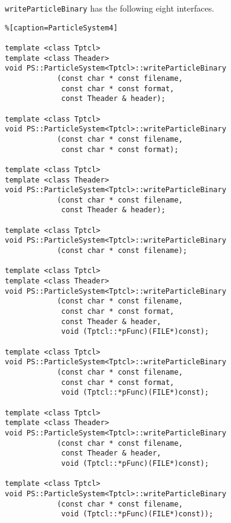 \label{sec:writeParticleBinary}

\texttt{writeParticleBinary} has the following eight interfaces.
\begin{lstlisting}%[caption=ParticleSystem4]

template <class Tptcl>
template <class Theader>
void PS::ParticleSystem<Tptcl>::writeParticleBinary
            (const char * const filename,
             const char * const format,
             const Theader & header);
             
template <class Tptcl>
void PS::ParticleSystem<Tptcl>::writeParticleBinary
            (const char * const filename,
             const char * const format);

template <class Tptcl>
template <class Theader>
void PS::ParticleSystem<Tptcl>::writeParticleBinary
            (const char * const filename,
             const Theader & header);

template <class Tptcl>
void PS::ParticleSystem<Tptcl>::writeParticleBinary
            (const char * const filename);

template <class Tptcl>
template <class Theader>
void PS::ParticleSystem<Tptcl>::writeParticleBinary
            (const char * const filename,
             const char * const format,
             const Theader & header,
             void (Tptcl::*pFunc)(FILE*)const);

template <class Tptcl>
void PS::ParticleSystem<Tptcl>::writeParticleBinary
            (const char * const filename,
             const char * const format,
             void (Tptcl::*pFunc)(FILE*)const);

template <class Tptcl>
template <class Theader>
void PS::ParticleSystem<Tptcl>::writeParticleBinary
            (const char * const filename,
             const Theader & header,
             void (Tptcl::*pFunc)(FILE*)const);

template <class Tptcl>             
void PS::ParticleSystem<Tptcl>::writeParticleBinary
            (const char * const filename,
             void (Tptcl::*pFunc)(FILE*)const));
\end{lstlisting}


